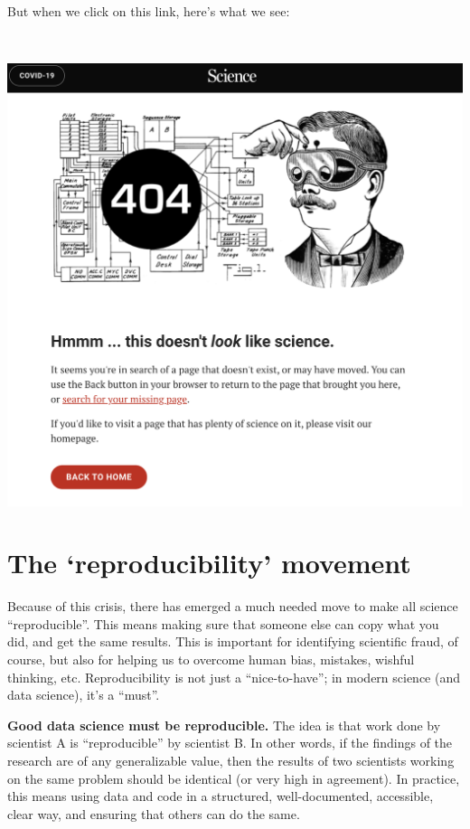 \documentclass[]{book}
\begin{document}
~

But when we click on this link, here's what we see:

~

\includegraphics{img/reproducibility-2.png}

\hypertarget{the-reproducibility-movement}{%
\section*{The `reproducibility' movement}\label{the-reproducibility-movement}}

Because of this crisis, there has emerged a much needed move to make all science ``reproducible''. This means making sure that someone else can copy what you did, and get the same results. This is important for identifying scientific fraud, of course, but also for helping us to overcome human bias, mistakes, wishful thinking, etc. Reproducibility is not just a ``nice-to-have''; in modern science (and data science), it's a ``must''.

\textbf{Good data science must be reproducible.} The idea is that work done by scientist A is ``reproducible'' by scientist B. In other words, if the findings of the research are of any generalizable value, then the results of two scientists working on the same problem should be identical (or very high in agreement). In practice, this means using data and code in a structured, well-documented, accessible, clear way, and ensuring that others can do the same.
\end{document}
